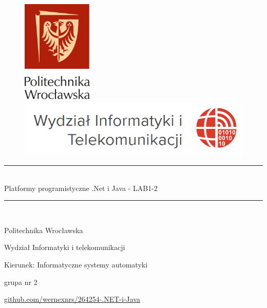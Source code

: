 \documentclass{report}
\begin{document}
	\begin{titlepage}
		\begin{figure}[h]
			\begin{minipage}[l]{.5\textwidth}%
				\includegraphics[width=0.3\textwidth]{pwr_logo}
			\end{minipage}%
			\begin{minipage}[r]{.5\textwidth}%
				\includegraphics[width=1\textwidth]{wit_logo}
			\end{minipage}%
		\end{figure}
		
		\vspace*{3mm}
		
		\begin{center}
			\rule{\textwidth}{0.8pt}\\ 
			\vspace*{6mm}
			{\LARGE Platformy programistyczne .Net i Java - LAB1-2}\\
			\vspace*{3mm}
			\rule{\textwidth}{0.8pt}\\
			
			\vspace{1.5cm}
			{
				Politechnika Wrocławska
				
				Wydział Informatyki i telekomunikacji
				
				Kierunek: Informatyczne systemy automatyki
				
				grupa nr 2
				
				\href{https://github.com/wernexnrs/264254-.NET-i-Java}{github.com/wernexnrs/264254-.NET-i-Java}
				
}
\end{center}
\end{titlepage}
\end{document}
